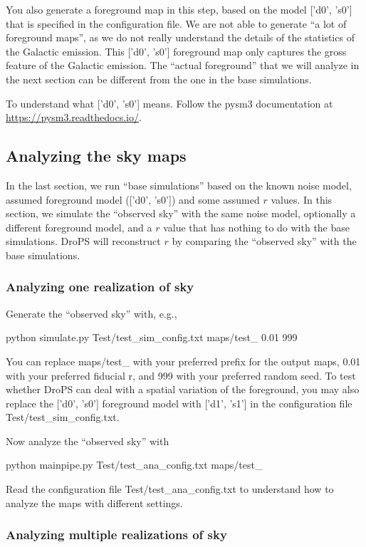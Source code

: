 \documentclass[12pt, a4paper]{ctexart} %
\def\tbox#1{\begin{tcolorbox}#1\end{tcolorbox}}
\begin{document}
You also generate a foreground map in this step, based on the model ['d0', 's0'] that is specified in the configuration file. We are not able to generate ``a lot of foreground maps'', as we do not really understand the details of the statistics of the Galactic emission. This ['d0', 's0'] foreground map only captures the gross feature of the Galactic emission. The ``actual foreground'' that we will analyze in the next section can be different from the one in the base simulations.

To understand what ['d0', 's0'] means. Follow the pysm3 documentation at \url{https://pysm3.readthedocs.io/}.

\subsection{Analyzing the sky maps}

In the last section, we run ``base simulations'' based on the known noise model, assumed foreground model (['d0', 's0'])  and some assumed $r$ values. In this section, we simulate the ``observed sky'' with the same noise model, optionally a different foreground model, and a $r$ value that has nothing to do with the base simulations. DroPS will reconstruct $r$ by comparing the ``observed sky'' with  the base simulations.

\subsubsection{Analyzing one realization of sky}

Generate the ``observed sky'' with, e.g.,
\tbox{python simulate.py Test/test\_sim\_config.txt maps/test\_  0.01 999}

You can replace maps/test\_ with your preferred prefix for the output maps, 0.01 with your preferred fiducial r, and 999 with your preferred random seed. To test whether DroPS can deal with a spatial variation of the foreground, you may also replace the ['d0', 's0'] foreground model with ['d1', 's1'] in the configuration file Test/test\_sim\_config.txt.

Now analyze the ``observed sky'' with
\tbox{python mainpipe.py Test/test\_ana\_config.txt maps/test\_}
Read the configuration file Test/test\_ana\_config.txt to understand how to analyze the maps with different settings.

\subsubsection{Analyzing multiple realizations of sky}
\end{document}
